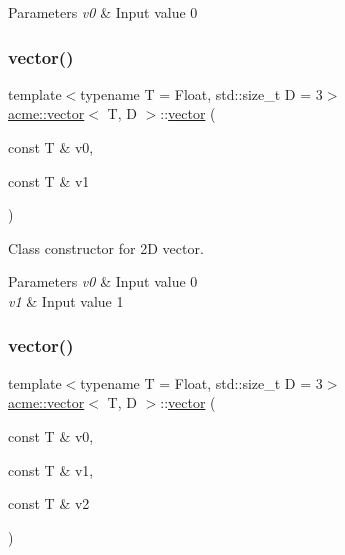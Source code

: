 \begin{DoxyParams}{Parameters}
{\em v0} & Input value 0 \\
\hline
\end{DoxyParams}
\mbox{\label{classacme_1_1vector_a8ff8e02ac02848f92e7c8d04e6e24e85}} 
\subsubsection{\texorpdfstring{vector()}{vector()}\hspace{0.1cm}{\footnotesize\ttfamily [2/5]}}
{\footnotesize\ttfamily template$<$typename T = Float, std\+::size\+\_\+t D = 3$>$ \\
\hyperlink{classacme_1_1vector}{acme\+::vector}$<$ T, D $>$\+::\hyperlink{classacme_1_1vector}{vector} (\begin{DoxyParamCaption}\item[{const T \&}]{v0,  }\item[{const T \&}]{v1 }\end{DoxyParamCaption})\hspace{0.3cm}{\ttfamily [inline]}}



Class constructor for 2D vector. 


\begin{DoxyParams}{Parameters}
{\em v0} & Input value 0 \\
\hline
{\em v1} & Input value 1 \\
\hline
\end{DoxyParams}
\mbox{\label{classacme_1_1vector_ae5a62d7c7bb2c843014935db07c65e63}} 
\subsubsection{\texorpdfstring{vector()}{vector()}\hspace{0.1cm}{\footnotesize\ttfamily [3/5]}}
{\footnotesize\ttfamily template$<$typename T = Float, std\+::size\+\_\+t D = 3$>$ \\
\hyperlink{classacme_1_1vector}{acme\+::vector}$<$ T, D $>$\+::\hyperlink{classacme_1_1vector}{vector} (\begin{DoxyParamCaption}\item[{const T \&}]{v0,  }\item[{const T \&}]{v1,  }\item[{const T \&}]{v2 }\end{DoxyParamCaption})\hspace{0.3cm}{\ttfamily [inline]}}



